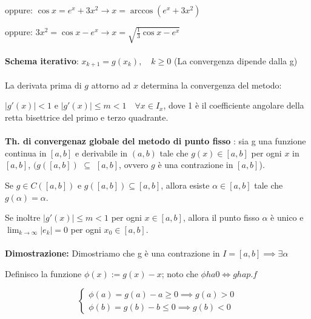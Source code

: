\documentclass[a4paper, 11pt]{article}
\begin{document}
        oppure: $\cos x = e^x + 3x^2 \rightarrow x = \arccos(e^x + 3x^2)$
        
        oppure: $3x^2 = \cos x - e^x \rightarrow x = \sqrt{\frac{1}{3} \cos x - e^x}$

        \paragraph{}
        \textbf{Schema iterativo}: $x_{k+1} = g(x_k), \quad k \geq 0$ 
        (La convergenza dipende dalla g)

        \paragraph{}
        La derivata prima di $g$ attorno ad $x$ determina la convergenza del metodo: 
        
        $|g'(x)| < 1$ e $|g'(x)| \leq m < 1 \quad \forall x \in I_x$, dove 1 è il coefficiente angolare della retta bisettrice del primo e terzo quadrante.

        \paragraph{}
        \textbf{Th. di convergenaz globale del metodo di punto fisso }: sia g una funzione continua in $[a,b]$ e derivabile in $(a,b)$ tale che $g(x) \in [a,b]$ per ogni $x$ in $[a,b]$, $(g([a,b])$ $\subseteq$ $[a,b]$, ovvero $g$ è una contrazione in $[a,b]$).

        Se $g \in C([a,b])$ e $g([a,b]) \subseteq [a,b]$, allora esiste $\alpha \in [a,b]$ tale che $g(\alpha) = \alpha$.

        Se inoltre $|g'(x)| \le m < 1$ per ogni $x \in [a,b]$, allora il punto fisso $\alpha$ è unico e $\lim_{k \to \infty} |e_k| = 0$ per ogni $x_0 \in [a,b]$.

        \paragraph{}
        \textbf{Dimostrazione:} Dimostriamo che g è una contrazione in $I = [a,b] \implies \exists \alpha$

        Definisco la funzione $\phi(x) := g(x) - x$; noto che $\phi ha 0 \iff g ha p.f$

        \[
        \begin{cases}
            \phi(a) = g(a) - a \ge 0  \implies g(a) > 0\\
            \phi(b) = g(b) - b \le 0 \implies g(b) < 0
        \end{cases}
        \]
\end{document}
